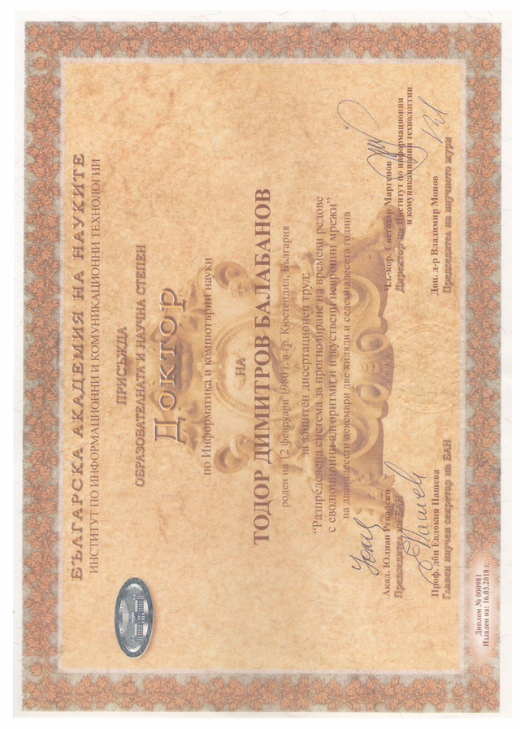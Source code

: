 \documentclass[bulgarian,a4paper]{europasscv}
\begin{document}
\includegraphics[width=\textwidth,height=\textheight,keepaspectratio]{DiplomaIICT2018}
\end{document}
